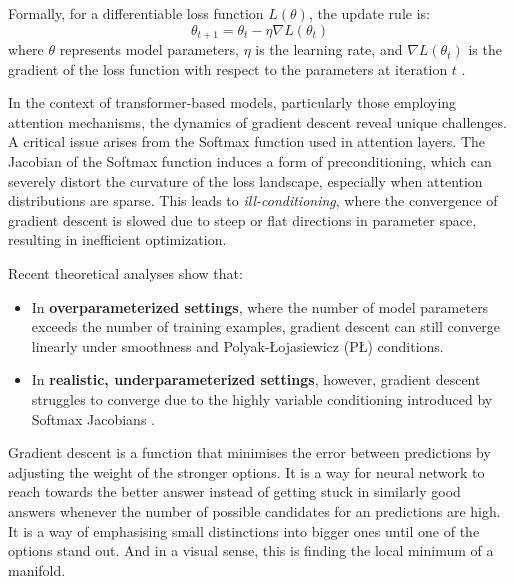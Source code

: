 Formally, for a differentiable loss function \( L(\theta) \), the update rule is:
\[
	\theta_{t+1} = \theta_t - \eta \nabla L(\theta_t)
\]
where \( \theta \) represents model parameters, \( \eta \) is the learning rate, and \( \nabla L(\theta_t) \) is the gradient of the loss function with respect to the parameters at iteration \( t \) \cite{tarmoun2024}.

In the context of transformer-based models, particularly those employing attention mechanisms, the dynamics of gradient descent reveal unique challenges. A critical issue arises from the Softmax function used in attention layers. The Jacobian of the Softmax function induces a form of preconditioning, which can severely distort the curvature of the loss landscape, especially when attention distributions are sparse. This leads to \textit{ill-conditioning}, where the convergence of gradient descent is slowed due to steep or flat directions in parameter space, resulting in inefficient optimization.

Recent theoretical analyses show that:
\begin{itemize}
	\item In \textbf{overparameterized settings}, where the number of model parameters exceeds the number of training examples, gradient descent can still converge linearly under smoothness and Polyak-Łojasiewicz (PŁ) conditions.
	\item In \textbf{realistic, underparameterized settings}, however, gradient descent struggles to converge due to the highly variable conditioning introduced by Softmax Jacobians \parencite[8-9]{tarmoun2024}.
\end{itemize}



Gradient descent is a function that minimises the error between predictions by
adjusting the weight of the stronger options. It is a way for neural network to
reach towards the better answer instead of getting stuck in similarly good
answers whenever the number of possible candidates for an predictions are high.
It is a way of emphasising small distinctions into bigger ones until one of the
options stand out. And in a visual sense, this is finding the local minimum of
a manifold.


